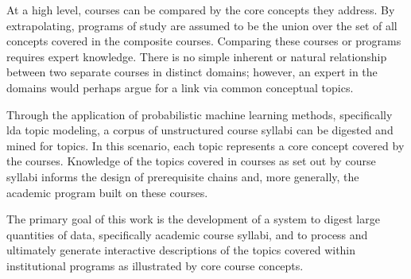 At a high level, courses can be compared by the core concepts they address.
By extrapolating, programs of study are assumed to be the union over the set
of all concepts covered in the composite courses. Comparing these courses
or programs requires expert knowledge. There is no simple inherent or
natural relationship between two separate courses in distinct domains;
however, an expert in the domains would perhaps argue for a link via common
conceptual topics.

Through the application of  probabilistic machine learning methods,
specifically \ac{lda} topic modeling, a corpus of unstructured course
syllabi can be digested and mined for topics. In this scenario, each topic
represents a core concept covered by the courses. Knowledge of the topics
covered in courses as set out by course syllabi informs the design of
prerequisite chains and, more generally, the academic program built on
these courses.

The primary goal of this work is the development of a system to digest
large quantities of data, specifically academic course syllabi, and to
process and ultimately generate interactive descriptions of the topics
covered within institutional programs as illustrated by core course
concepts.

